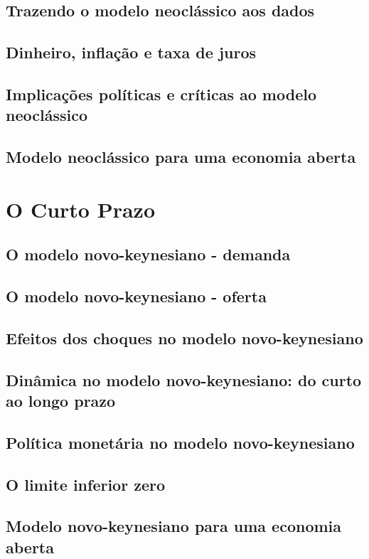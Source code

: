 \documentclass[a4paper,11pt]{book}
\theoremstyle{definition}
\begin{document}
\chapter{Trazendo o modelo neoclássico aos dados}
\chapter{Dinheiro, inflação e taxa de juros}
\chapter{Implicações políticas e críticas ao modelo neoclássico}
\chapter{Modelo neoclássico para uma economia aberta}

\part{O Curto Prazo}

\chapter{O modelo novo-keynesiano - demanda}
\chapter{O modelo novo-keynesiano - oferta}
\chapter{Efeitos dos choques no modelo novo-keynesiano}
\chapter{Dinâmica no modelo novo-keynesiano: do curto ao longo prazo}
\chapter{Política monetária no modelo novo-keynesiano}
\chapter{O limite inferior zero}
\chapter{Modelo novo-keynesiano para uma economia aberta}
\end{document}
